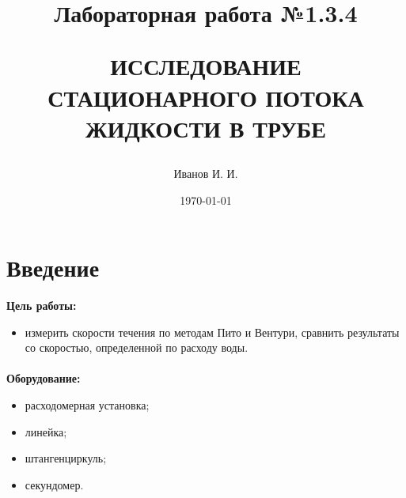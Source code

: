 \documentclass[a4paper, 12pt]{article}
\title{ \begin{center}Лабораторная работа №1.3.4\end{center}
ИССЛЕДОВАНИЕ СТАЦИОНАРНОГО ПОТОКА ЖИДКОСТИ В ТРУБЕ }
\author{Иванов И. И.}
\date{\today}
\begin{document}
\maketitle
\newpage

\section{Введение}

\textbf{Цель работы:}
\begin{itemize}
    \item измерить скорости течения по методам Пито и Вентури, сравнить результаты со скоростью, определенной по расходу воды.
    \end{itemize}
\paragraph{}
\textbf{Оборудование:}
\begin{itemize}
    \item расходомерная установка; 
    \item линейка; 
    \item штангенциркуль;  
    \item секундомер.    
    \end{itemize}
\end{document}
